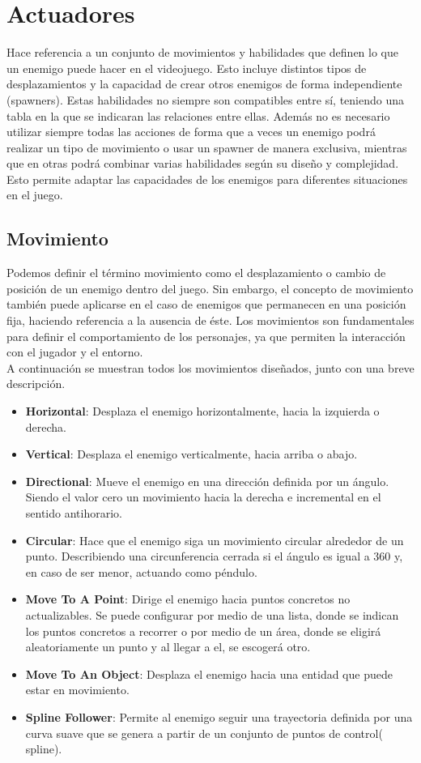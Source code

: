 \section{Actuadores}
\label{subsec:acciones}
Hace referencia a un conjunto de movimientos y habilidades que definen lo que un enemigo puede hacer en el videojuego. Esto incluye distintos tipos de desplazamientos y la capacidad de crear otros enemigos de forma independiente (spawners). Estas habilidades no siempre son compatibles entre sí, teniendo una tabla en la que se indicaran las relaciones entre ellas. Además no es necesario utilizar siempre todas las acciones de forma que a veces un enemigo podrá realizar un tipo de movimiento o usar un spawner de manera exclusiva, mientras que en otras podrá combinar varias habilidades según su diseño y complejidad. Esto permite adaptar las capacidades de los enemigos para diferentes situaciones en el juego.

\subsection{Movimiento}
Podemos definir el término movimiento como el desplazamiento o cambio de posición de un enemigo dentro del juego. Sin embargo, el concepto de movimiento también puede aplicarse en el caso de enemigos que permanecen en una posición fija, haciendo referencia a la ausencia de éste. Los movimientos son fundamentales para definir el comportamiento de los personajes, ya que permiten la interacción con el jugador y el entorno.\\
A continuación se muestran todos los movimientos diseñados, junto con una breve descripción.
\begin{itemize}
  \item \textbf{Horizontal}: Desplaza el enemigo horizontalmente, hacia la izquierda o derecha.
    \item \textbf{Vertical}: Desplaza el enemigo verticalmente, hacia arriba o abajo.
    \item \textbf{Directional}: Mueve el enemigo en una dirección definida por un ángulo. Siendo el valor cero un movimiento hacia la derecha e incremental en el sentido antihorario.
    \item \textbf{Circular}: Hace que el enemigo siga un movimiento circular alrededor de un punto. Describiendo una circunferencia cerrada si el ángulo es igual a 360 y, en caso de ser menor, actuando como péndulo.
    \item \textbf{Move To A Point}: Dirige el enemigo hacia puntos concretos no actualizables. Se puede configurar por medio de una lista, donde se indican los puntos concretos a recorrer o por medio de un área, donde se eligirá aleatoriamente un punto y al llegar a el, se escogerá otro.
    \item \textbf{Move To An Object}: Desplaza el enemigo hacia una entidad que puede estar en movimiento.
    \item \textbf{Spline Follower}: Permite al enemigo seguir una trayectoria definida por una curva suave que se genera a partir de un conjunto de puntos de control( spline).
\end{itemize}

